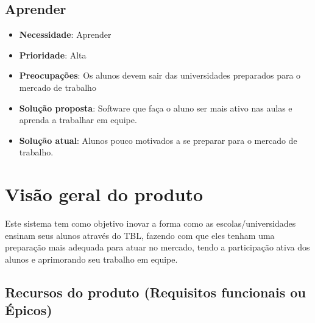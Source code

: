 \subsection{Aprender}

\begin{itemize}
  \item \textbf{Necessidade}: Aprender
  \item \textbf{Prioridade}: Alta
  \item \textbf{Preocupações}: Os alunos devem sair das universidades preparados para o mercado de trabalho
  \item \textbf{Solução proposta}: Software que faça o aluno ser mais ativo nas aulas e aprenda a trabalhar em equipe.
  \item \textbf{Solução atual}: Alunos pouco motivados a se preparar para o mercado de trabalho.
\end{itemize}

\section{Visão geral do produto}

Este sistema tem como objetivo inovar a forma como as escolas/universidades ensinam seus alunos através do TBL, fazendo com que eles tenham uma preparação mais adequada para atuar no mercado, tendo a participação ativa dos alunos e aprimorando seu trabalho em equipe.

\subsection{Recursos do produto (Requisitos funcionais ou Épicos)}

